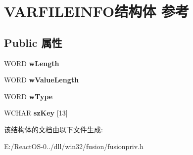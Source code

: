 \hypertarget{struct_v_a_r_f_i_l_e_i_n_f_o}{}\section{V\+A\+R\+F\+I\+L\+E\+I\+N\+F\+O结构体 参考}
\label{struct_v_a_r_f_i_l_e_i_n_f_o}
\subsection*{Public 属性}
\begin{DoxyCompactItemize}
\item 
\mbox{\label{struct_v_a_r_f_i_l_e_i_n_f_o_a3bca491259b31f6ff9738e36dfd658fb}} 
W\+O\+RD {\bfseries w\+Length}
\item 
\mbox{\label{struct_v_a_r_f_i_l_e_i_n_f_o_a11190da3f37c108ad560089eb4c413a0}} 
W\+O\+RD {\bfseries w\+Value\+Length}
\item 
\mbox{\label{struct_v_a_r_f_i_l_e_i_n_f_o_a273bee76d8466a63eb88a340b6fdb917}} 
W\+O\+RD {\bfseries w\+Type}
\item 
\mbox{\label{struct_v_a_r_f_i_l_e_i_n_f_o_a50933042fb6fb052e7014c4cbdbb306a}} 
W\+C\+H\+AR {\bfseries sz\+Key} \mbox{[}13\mbox{]}
\end{DoxyCompactItemize}


该结构体的文档由以下文件生成\+:\begin{DoxyCompactItemize}
\item 
E\+:/\+React\+O\+S-\/0../dll/win32/fusion/fusionpriv.\+h\end{DoxyCompactItemize}
